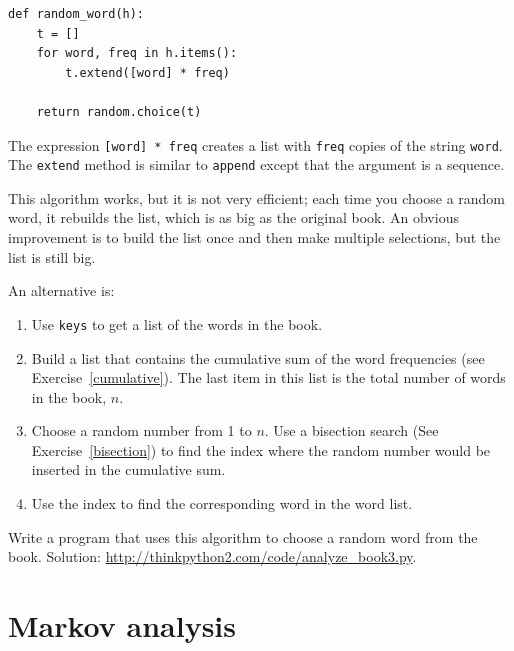 \documentclass[10pt]{book}
\begin{document}
\begin{verbatim}
def random_word(h):
    t = []
    for word, freq in h.items():
        t.extend([word] * freq)

    return random.choice(t)
\end{verbatim}
%
The expression {\tt [word] * freq} creates a list with {\tt freq}
copies of the string {\tt word}.  The {\tt extend}
method is similar to {\tt append} except that the argument is
a sequence.

This algorithm works, but it is not very efficient; each time you
choose a random word, it rebuilds the list, which is as big as
the original book.  An obvious improvement is to build the list
once and then make multiple selections, but the list is still big.

An alternative is:

\begin{enumerate}

\item Use {\tt keys} to get a list of the words in the book.

\item Build a list that contains the cumulative sum of the word
  frequencies (see Exercise~\ref{cumulative}).  The last item
  in this list is the total number of words in the book, $n$.
  
\item Choose a random number from 1 to $n$.  Use a bisection search
  (See Exercise~\ref{bisection}) to find the index where the random
  number would be inserted in the cumulative sum.

\item Use the index to find the corresponding word in the word list.

\end{enumerate}

\begin{exercise}
\label{randhist}

Write a program that uses this algorithm to choose a random word from
the book.  Solution:
\url{http://thinkpython2.com/code/analyze_book3.py}.

\end{exercise}



\section{Markov analysis}
\label{markov}
\end{document}
